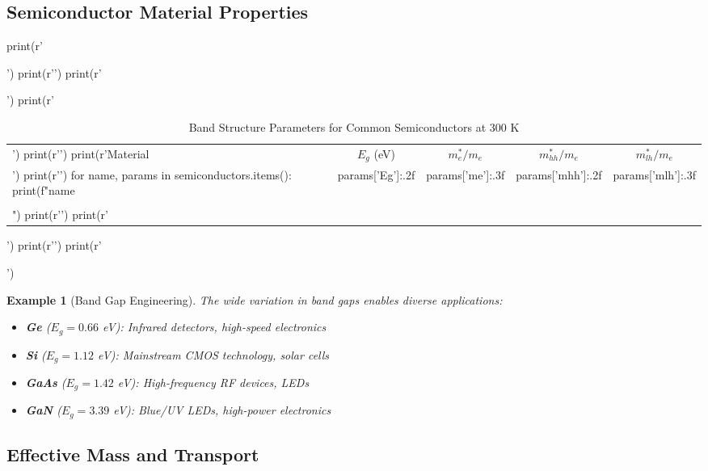 \documentclass[11pt,a4paper]{article}
\newtheorem{example}{Example}[section]
\begin{document}
\subsection{Semiconductor Material Properties}

\begin{pycode}
print(r'\begin{table}[H]')
print(r'\centering')
print(r'\caption{Band Structure Parameters for Common Semiconductors at 300 K}')
print(r'\begin{tabular}{@{}lcccc@{}}')
print(r'\toprule')
print(r'Material & $E_g$ (eV) & $m_e^*/m_e$ & $m_{hh}^*/m_e$ & $m_{lh}^*/m_e$ \\')
print(r'\midrule')
for name, params in semiconductors.items():
    print(f"{name} & {params['Eg']:.2f} & {params['me']:.3f} & {params['mhh']:.2f} & {params['mlh']:.3f} \\\\")
print(r'\bottomrule')
print(r'\end{tabular}')
print(r'\label{tab:semiconductors}')
print(r'\end{table}')
\end{pycode}

\begin{example}[Band Gap Engineering]
The wide variation in band gaps enables diverse applications:
\begin{itemize}
\item \textbf{Ge} ($E_g = 0.66$ eV): Infrared detectors, high-speed electronics
\item \textbf{Si} ($E_g = 1.12$ eV): Mainstream CMOS technology, solar cells
\item \textbf{GaAs} ($E_g = 1.42$ eV): High-frequency RF devices, LEDs
\item \textbf{GaN} ($E_g = 3.39$ eV): Blue/UV LEDs, high-power electronics
\end{itemize}
\end{example}

\subsection{Effective Mass and Transport}
\end{document}
